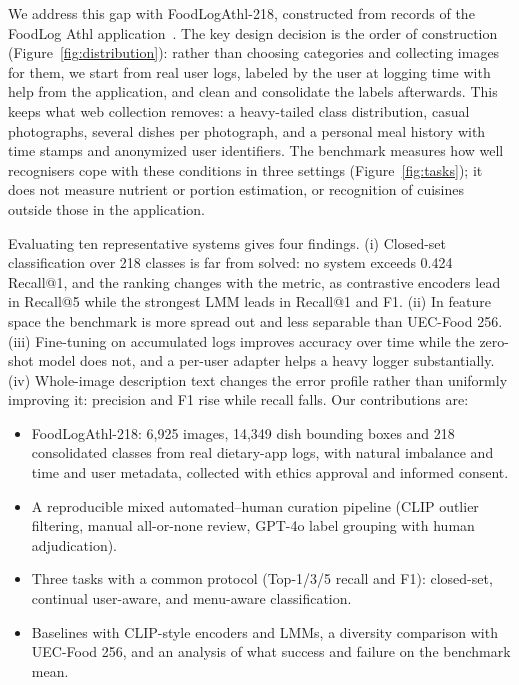\documentclass[sigconf, nonacm]{acmart}
\begin{document}
We address this gap with FoodLogAthl-218, constructed from records of the FoodLog Athl application~\cite{nakamoto2022foodlog}. The key design decision is the order of construction (Figure~\ref{fig:distribution}): rather than choosing categories and collecting images for them, we start from real user logs, labeled by the user at logging time with help from the application, and clean and consolidate the labels afterwards. This keeps what web collection removes: a heavy-tailed class distribution, casual photographs, several dishes per photograph, and a personal meal history with time stamps and anonymized user identifiers. The benchmark measures how well recognisers cope with these conditions in three settings (Figure~\ref{fig:tasks}); it does not measure nutrient or portion estimation, or recognition of cuisines outside those in the application.

Evaluating ten representative systems gives four findings. (i) Closed-set classification over 218 classes is far from solved: no system exceeds 0.424 Recall@1, and the ranking changes with the metric, as contrastive encoders lead in Recall@5 while the strongest LMM leads in Recall@1 and F1. (ii) In feature space the benchmark is more spread out and less separable than UEC-Food 256. (iii) Fine-tuning on accumulated logs improves accuracy over time while the zero-shot model does not, and a per-user adapter helps a heavy logger substantially. (iv) Whole-image description text changes the error profile rather than uniformly improving it: precision and F1 rise while recall falls. Our contributions are:
\begin{itemize}[leftmargin=1.2em,itemsep=0pt,topsep=2pt]
  \item FoodLogAthl-218: 6,925 images, 14,349 dish bounding boxes and 218 consolidated classes from real dietary-app logs, with natural imbalance and time and user metadata, collected with ethics approval and informed consent.
  \item A reproducible mixed automated--human curation pipeline (CLIP outlier filtering, manual all-or-none review, GPT-4o label grouping with human adjudication).
  \item Three tasks with a common protocol (Top-1/3/5 recall and F1): closed-set, continual user-aware, and menu-aware classification.
  \item Baselines with CLIP-style encoders and LMMs, a diversity comparison with UEC-Food 256, and an analysis of what success and failure on the benchmark mean.
\end{itemize}
\end{document}
